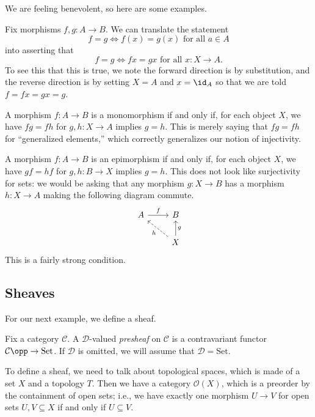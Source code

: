 \documentclass[../notes.tex]{subfiles}
\begin{document}
We are feeling benevolent, so here are some examples.
\begin{example}
	Fix morphisms $f,g:A\to B$. We can translate the statement
	\[f=g\iff f(x)=g(x)\text{ for all }a\in A\]
	into asserting that
	\[f=g\iff fx=gx\text{ for all }x:X\to A.\]
	To see this that this is true, we note the forward direction is by substitution, and the reverse direction is by setting $X=A$ and $x=\id_A$ so that we are told $f=fx=gx=g$.
\end{example}
\begin{example}
	A morphism $f:A\to B$ is a monomorphism if and only if, for each object $X$, we have $fg=fh$ for $g,h:X\to A$ implies $g=h$. This is merely saying that $fg=fh$ for ``generalized elements,'' which correctly generalizes our notion of injectivity.
\end{example}
\begin{nex}
	A morphism $f:A\to B$ is an epimorphism if and only if, for each object $X$, we have $gf=hf$ for $g,h:B\to X$ implies $g=h$. This does not look like surjectivity for sets: we would be asking that any morphism $g:X\to B$ has a morphism $h:X\to A$ making the following diagram commute.
	\[\begin{tikzcd}
		A & B \\
		& X
		\arrow["f", from=1-1, to=1-2]
		\arrow["g"', from=2-2, to=1-2]
		\arrow["h", dashed, from=2-2, to=1-1]
	\end{tikzcd}\]
	This is a fairly strong condition.
\end{nex}

\subsection{Sheaves}
For our next example, we define a sheaf.
\begin{definition}[Presheaf]
	Fix a category $\mathcal C$. A $\mathcal D$-valued \textit{presheaf} on $\mathcal C$ is a contravariant functor $\mathcal C\opp\to\mathrm{Set}$. If $\mathcal D$ is omitted, we will assume that $\mathcal D=\mathrm{Set}$.
\end{definition}
To define a sheaf, we need to talk about topological spaces, which is made of a set $X$ and a topology $T$. Then we have a category $\mathcal O(X)$, which is a preorder by the containment of open sets; i.e., we have exactly one morphism $U\to V$ for open sets $U,V\subseteq X$ if and only if $U\subseteq V$.
\end{document}
